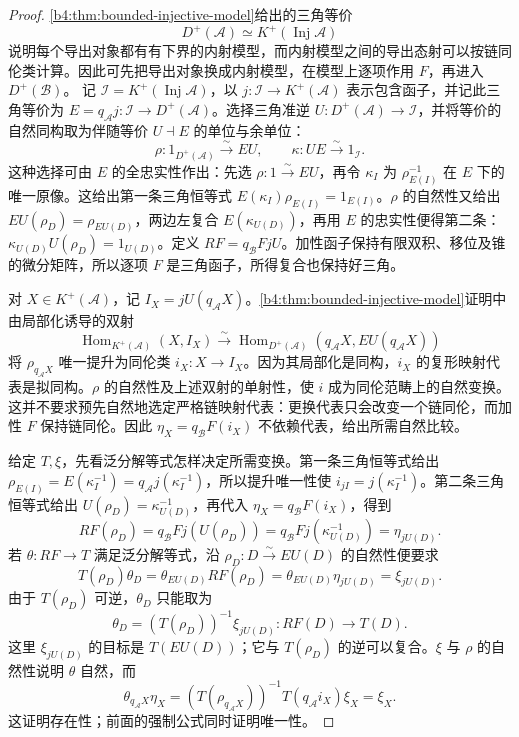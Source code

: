 \begin{proof}
	\cref{b4:thm:bounded-injective-model}给出的三角等价
	\[
		D^+(\mathcal A)\simeq K^+(\operatorname{Inj}\mathcal A)
	\]
	说明每个导出对象都有有下界的内射模型，而内射模型之间的导出态射可以按链同伦类计算。因此可先把导出对象换成内射模型，在模型上逐项作用 \(F\)，再进入 \(D^+(\mathcal B)\)。 记 \(\mathcal I=K^+(\operatorname{Inj}\mathcal A)\)，以 \(j:\mathcal I\to K^+(\mathcal A)\) 表示包含函子，并记此三角等价为 \(E=q_{\mathcal A}j:\mathcal I\to D^+(\mathcal A)\)。选择三角准逆 \(U:D^+(\mathcal A)\to\mathcal I\)，并将等价的自然同构取为伴随等价 \(U\dashv E\) 的单位与余单位：
	\[
		\rho:1_{D^+(\mathcal A)}\xrightarrow{\sim}EU, \qquad \kappa:UE\xrightarrow{\sim}1_{\mathcal I}.
	\]
	这种选择可由 \(E\) 的全忠实性作出：先选 \(\rho:1\xrightarrow{\sim}EU\)，再令 \(\kappa_I\) 为 \(\rho_{E(I)}^{-1}\) 在 \(E\) 下的唯一原像。这给出第一条三角恒等式 \(E(\kappa_I)\rho_{E(I)}=1_{E(I)}\)。\(\rho\) 的自然性又给出 \(EU(\rho_D)=\rho_{EU(D)}\)，两边左复合 \(E(\kappa_{U(D)})\)，再用 \(E\) 的忠实性便得第二条： \(\kappa_{U(D)}U(\rho_D)=1_{U(D)}\)。定义 \(RF=q_{\mathcal B}FjU\)。加性函子保持有限双积、移位及锥的微分矩阵，所以逐项 \(F\) 是三角函子，所得复合也保持好三角。

	对 \(X\in K^+(\mathcal A)\)，记 \(I_X=jU(q_{\mathcal A}X)\)。\cref{b4:thm:bounded-injective-model}证明中由局部化诱导的双射
	\[
		\operatorname{Hom}_{K^+(\mathcal A)}(X,I_X) \xrightarrow{\sim} \operatorname{Hom}_{D^+(\mathcal A)}(q_{\mathcal A}X,E U(q_{\mathcal A}X))
	\]
	将 \(\rho_{q_{\mathcal A}X}\) 唯一提升为同伦类 \(i_X:X\to I_X\)。因为其局部化是同构，\(i_X\) 的复形映射代表是拟同构。\(\rho\) 的自然性及上述双射的单射性，使 \(i\) 成为同伦范畴上的自然变换。这并不要求预先自然地选定严格链映射代表：更换代表只会改变一个链同伦，而加性 \(F\) 保持链同伦。因此 \(\eta_X=q_{\mathcal B}F(i_X)\) 不依赖代表，给出所需自然比较。

	给定 \(T,\xi\)，先看泛分解等式怎样决定所需变换。第一条三角恒等式给出 \(\rho_{E(I)}=E(\kappa_I^{-1})=q_{\mathcal A}j(\kappa_I^{-1})\)，所以提升唯一性使 \(i_{jI}=j(\kappa_I^{-1})\)。第二条三角恒等式给出 \(U(\rho_D)=\kappa_{U(D)}^{-1}\)，再代入 \(\eta_X=q_{\mathcal B}F(i_X)\)，得到
	\[
		RF(\rho_D)=q_{\mathcal B}Fj(U(\rho_D)) =q_{\mathcal B}Fj(\kappa_{U(D)}^{-1}) =\eta_{jU(D)}.
	\]
	若 \(\theta:RF\to T\) 满足泛分解等式，沿 \(\rho_D:D\xrightarrow{\sim}EU(D)\) 的自然性便要求
	\[
		T(\rho_D)\theta_D =\theta_{EU(D)}RF(\rho_D) =\theta_{EU(D)}\eta_{jU(D)} =\xi_{jU(D)}.
	\]
	由于 \(T(\rho_D)\) 可逆，\(\theta_D\) 只能取为
	\[
		\theta_D=(T(\rho_D))^{-1}\xi_{jU(D)}: RF(D)\longrightarrow T(D).
	\]
	这里 \(\xi_{jU(D)}\) 的目标是 \(T(EU(D))\)；它与 \(T(\rho_D)\) 的逆可以复合。\(\xi\) 与 \(\rho\) 的自然性说明 \(\theta\) 自然，而
	\[
		\theta_{q_{\mathcal A}X}\eta_X =(T(\rho_{q_{\mathcal A}X}))^{-1} T(q_{\mathcal A}i_X)\xi_X=\xi_X.
	\]
	这证明存在性；前面的强制公式同时证明唯一性。


\end{proof}
